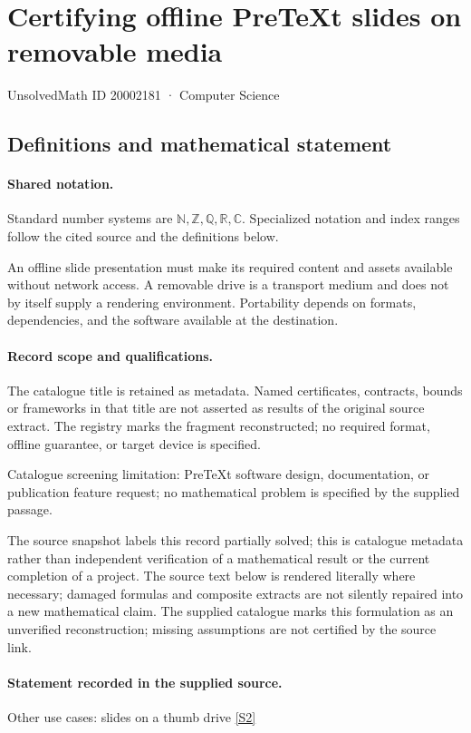 \documentclass[11pt]{article}
\newcommand{\sref}[2]{\hyperlink{source:#1:#2}{[S#2]}}
\begin{document}
\setcounter{section}{20002180}
\section{Certifying offline PreTeXt slides on removable media}\label{20002181}
{\small\sffamily UnsolvedMath ID 20002181 · Computer Science}
\subsection{Definitions and mathematical statement}

\paragraph{Shared notation.}Standard number systems are $\mathbb N,\mathbb Z,\mathbb Q,\mathbb R,\mathbb C$. Specialized notation and index ranges follow the cited source and the definitions below.


An offline slide presentation must make its required content and assets available without network access. A removable drive is a transport medium and does not by itself supply a rendering environment. Portability depends on formats, dependencies, and the software available at the destination.
\paragraph{Record scope and qualifications.}
The catalogue title is retained as metadata. Named certificates, contracts, bounds or frameworks in that title are not asserted as results of the original source extract.
The registry marks the fragment reconstructed; no required format, offline guarantee, or target device is specified.

Catalogue screening limitation: PreTeXt software design, documentation, or publication feature request; no mathematical problem is specified by the supplied passage.

The source snapshot labels this record partially solved; this is catalogue metadata rather than independent verification of a mathematical result or the current completion of a project.
The source text below is rendered literally where necessary; damaged formulas and composite extracts are not silently repaired into a new mathematical claim.
The supplied catalogue marks this formulation as an unverified reconstruction; missing assumptions are not certified by the source link.
\paragraph{Statement recorded in the supplied source.}
Other use cases: slides on a thumb drive \sref{20002181}{2}
\end{document}
